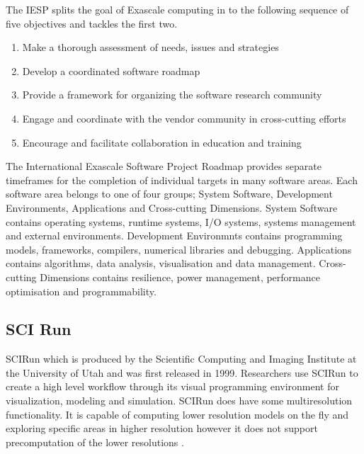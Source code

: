 \documentclass[12pt,a4paper]{article}
\begin{document}
The IESP splits the goal of Exascale computing in to the following sequence of five objectives and tackles the first two.

\begin{enumerate}
\item Make a thorough assessment of needs, issues and strategies
\item Develop a coordinated software roadmap
\item Provide a framework for organizing the software research community
\item Engage and coordinate with the vendor community in cross-cutting efforts
\item Encourage and facilitate collaboration in education and training
\end{enumerate}

The International Exascale Software Project Roadmap provides separate timeframes for the completion of individual targets in many software areas. Each software area belongs to one of four groups; System Software, Development Environments, Applications and Cross-cutting Dimensions. System Software contains operating systems, runtime systems, I/O systems, systems management and external environments. Development Environmnts contains programming models, frameworks, compilers, numerical libraries and debugging. Applications contains algorithms, data analysis, visualisation and data management. Cross-cutting Dimensions contains resilience, power management, performance optimisation and programmability. 



\subsection{SCI Run}
SCIRun \cite{SCI:SCIRun} which is produced by the Scientific Computing and Imaging Institute at the University of Utah and was first released in 1999. Researchers use SCIRun to create a high level workflow through its visual programming environment for visualization, modeling and simulation. SCIRun does have some multiresolution functionality. It is capable of computing lower resolution models on the fly and exploring specific areas in higher resolution however it does not support precomputation of the lower resolutions \cite{SCIRun2}.
\end{document}
